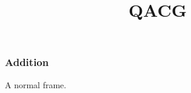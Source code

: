 \documentclass[utf8]{beamer}
\begin{document}
\title{QACG}

\begin{frame}

\titlepage

\end{frame}

\begin{frame}

  \frametitle{Addition}
A normal frame.

\end{frame}
\end{document}
